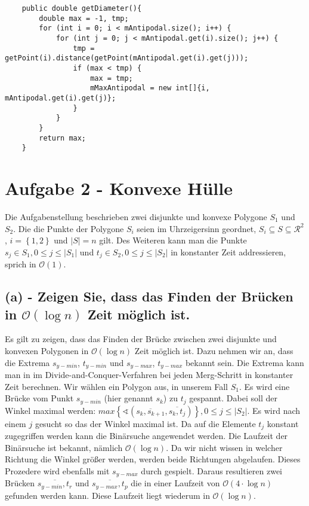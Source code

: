 \documentclass[a4paper]{article}
\begin{document}
\begin{lstlisting}
	public double getDiameter(){
        double max = -1, tmp;
        for (int i = 0; i < mAntipodal.size(); i++) {
            for (int j = 0; j < mAntipodal.get(i).size(); j++) {
                tmp = getPoint(i).distance(getPoint(mAntipodal.get(i).get(j)));
                if (max < tmp) {
                    max = tmp;
                    mMaxAntipodal = new int[]{i, mAntipodal.get(i).get(j)};
                }
            }
        }
        return max;
    }
\end{lstlisting}

\section*{Aufgabe 2 - Konvexe Hülle}

Die Aufgabenstellung beschrieben zwei disjunkte und konvexe Polygone $S_1$ und $S_2$. Die die Punkte der Polygone $S_i$ seien im Uhrzeigersinn geordnet, $S_i \subseteq S \subseteq \mathcal{R}^2$, $i = \left\{1, 2\right\}$ und $|S| = n$ gilt. Des Weiteren kann man die Punkte $s_j \in S_1, 0 \leq j \leq |S_1|$ und $t_j \in S_2, 0 \leq j \leq |S_2|$ in konstanter Zeit addressieren, sprich in $\mathcal{O}(1)$.

\subsection*{(a) - Zeigen Sie, dass das Finden der Brücken in $\mathcal{O}(\log n)$ Zeit möglich ist.}

Es gilt zu zeigen, dass das Finden der Brücke zwischen zwei disjunkte und konvexen Polygonen in $\mathcal{O}(\log n)$ Zeit möglich ist. Dazu nehmen wir an, dass die Extrema $s_{y-min}$, $t_{y-min}$ und $s_{y-max}$, $t_{y-max}$ bekannt sein. Die Extrema kann man in im Divide-and-Conquer-Verfahren bei jeden Merg-Schritt in konstanter Zeit berechnen. Wir wählen ein Polygon aus, in unserem Fall $S_1$. Es wird eine Brücke vom Punkt $s_{y-min}$ (hier genannt $s_k$) zu $t_j$ gespannt. Dabei soll der Winkel maximal werden: $max \left\{\sphericalangle \left(\overline{s_k,s_{k+1}},\overline{s_k,t_j}\right)\right\}, 0 \leq j \leq |S_2|$. Es wird nach einem $j$ gesucht so das der Winkel maximal ist. Da auf die Elemente $t_j$ konstant zugegriffen werden kann die Binärsuche angewendet werden. Die Laufzeit der Binärsuche ist bekannt, nämlich $\mathcal{O}(\log n)$. Da wir nicht wissen in welcher Richtung die Winkel größer werden, werden beide Richtungen abgelaufen. Dieses Prozedere wird ebenfalls mit $s_{y-max}$ durch gespielt. Daraus resultieren zwei Brücken $\overline{s_{y-min}, t_r}$ und $\overline{s_{y-max}, t_p}$ die in einer Laufzeit von $\mathcal{O}(4 \cdot \log n)$ gefunden werden kann. Diese Laufzeit liegt wiederum in $\mathcal{O}(\log n)$.
\end{document}
